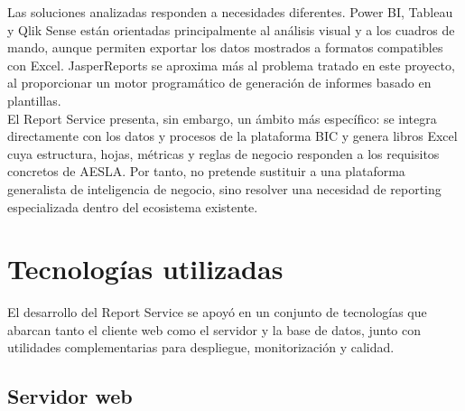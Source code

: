 \documentclass[11pt,a4paper,titlepage,oneside]{report}
\begin{document}
Las soluciones analizadas responden a necesidades diferentes. Power BI,
Tableau y Qlik Sense están orientadas principalmente al análisis visual y a
los cuadros de mando, aunque permiten exportar los datos mostrados a formatos
compatibles con Excel. JasperReports se aproxima más al problema tratado en
este proyecto, al proporcionar un motor programático de generación de
informes basado en plantillas. \\

El Report Service presenta, sin embargo, un ámbito más específico: se integra
directamente con los datos y procesos de la plataforma BIC y genera libros
Excel cuya estructura, hojas, métricas y reglas de negocio responden a los
requisitos concretos de AESLA. Por tanto, no pretende sustituir a una
plataforma generalista de inteligencia de negocio, sino resolver una necesidad
de reporting especializada dentro del ecosistema existente. \\

\section{Tecnologías utilizadas}

El desarrollo del Report Service se apoyó en un conjunto de tecnologías que abarcan tanto el cliente web como el servidor y la base de datos, junto con utilidades complementarias para despliegue, monitorización y calidad.

\subsection{Servidor web}
\end{document}
